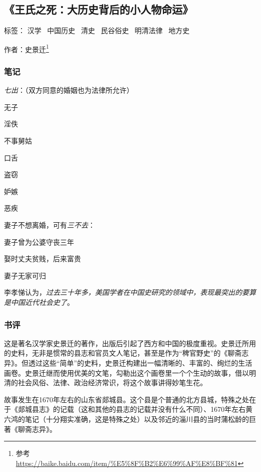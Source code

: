 \subsection{《王氏之死：大历史背后的小人物命运》}

标签： 汉学 \  中国历史 \  清史 \  民谷俗史 \  明清法律 \  地方史

作者：史景迁\footnote{参考\url{https://baike.baidu.com/item/\%E5\%8F\%B2\%E6\%99\%AF\%E8\%BF\%81}}

\subsubsection{笔记}
\emph{七出}：（双方同意的婚姻也为法律所允许）
\begin{itemize*}
	\item 无子
	\item 淫佚
	\item 不事舅姑
	\item 口舌
	\item 盗窃
	\item 妒嫉
	\item 恶疾
\end{itemize*}

妻子不想离婚，可有\emph{三不去}：
\begin{itemize*}
	\item 妻子曾为公婆守丧三年
	\item 娶时丈夫贫贱，后来富贵
	\item 妻子无家可归
\end{itemize*}

李孝悌认为，\emph{过去三十年多，美国学者在中国史研究的领域中，表现最突出的要算是中国近代社会史了}。

\subsubsection{书评}

这是著名汉学家史景迁的著作，出版后引起了西方和中国的极度重视。史景迁所用的史料，无非是惯常的县志和官员文人笔记，甚至是作为“稗官野史”的《聊斋志异》。但透过这些“简单”的史料，史景迁构建出一幅清晰的、丰富的、绚烂的生活画卷。史景迁继而使用优美的文笔，勾勒出这个画卷里一个个生动的故事，借以明清的社会风俗、法律、政治经济常识，将这个故事讲得妙笔生花。

故事发生在1670年左右的山东省郯城县。这个县是个普通的北方县城，特殊之处在于《郯城县志》的记载（这和其他的县志的记载并没有什么不同）、1670年左右黄六鸿的笔记（十分翔实准确，这是特殊之处）以及邻近的淄川县的当时蒲松龄的巨著《聊斋志异》。

